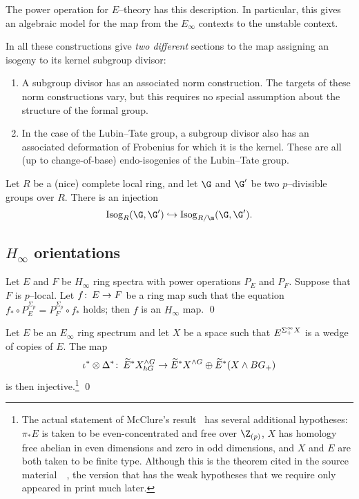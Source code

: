 The power operation for $E$--theory has this description.  In particular, this gives an algebraic model for the map from the $E_\infty$ contexts to the unstable context.



In all these constructions give \emph{two different} sections to the map assigning an isogeny to its kernel subgroup divisor:
\begin{enumerate}
    \item A subgroup divisor has an associated norm construction.  The targets of these norm constructions vary, but this requires no special assumption about the structure of the formal group.
    \item In the case of the Lubin--Tate group, a subgroup divisor also has an associated deformation of Frobenius for which it is the kernel.  These are all (up to change-of-base) endo-isogenies of the Lubin--Tate group.
\end{enumerate}




\begin{remark}
Let $R$ be a (nice) complete local ring, and let $\G$ and $\G'$ be two $p$--divisible groups over $R$.  There is an injection \[\Isog_R(\G, \G') \into \Isog_{R/\m}(\G, \G').\]
\end{remark}











\subsection*{$H_\infty$ orientations}

\begin{theorem}
Let $E$ and $F$ be $H_\infty$ ring spectra with power operations $P_E$ and $P_F$.  Suppose that $F$ is $p$--local.  Let $f\colon\thinspace E \to F$ be a ring map such that the equation $f_* \circ P^{\Sigma_p}_E = P^{\Sigma_p}_F \circ f_*$ holds; then $f$ is an $H_\infty$ map. \qed
\end{theorem}

\begin{theorem}
Let $E$ be an $E_\infty$ ring spectrum and let $X$ be a space such that $E^{\Sigma^\infty_+ X}$ is a wedge of copies of $E$.  The map \[\iota^* \otimes \Delta^*\colon\thinspace \widetilde E^* X^{\wedge G}_{hG} \to \widetilde E^* X^{\wedge G} \oplus \widetilde E^*(X \wedge BG_+)\] is then injective.\footnote{The actual statement of McClure's result~\cite[Proposition VIII.7.3]{BMMS} has several additional hypotheses: $\pi_* E$ is taken to be even-concentrated and free over $\Z_{(p)}$, $X$ has homology free abelian in even dimensions and zero in odd dimensions, and $X$ and $E$ are both taken to be finite type.  Although this is the theorem cited in the source material~\cite[Section 4]{Ando}~\cite[Proof of Proposition 6.1]{AHSHinfty}, the version that has the weak hypotheses that we require only appeared in print much later.} \qed
\end{theorem}

